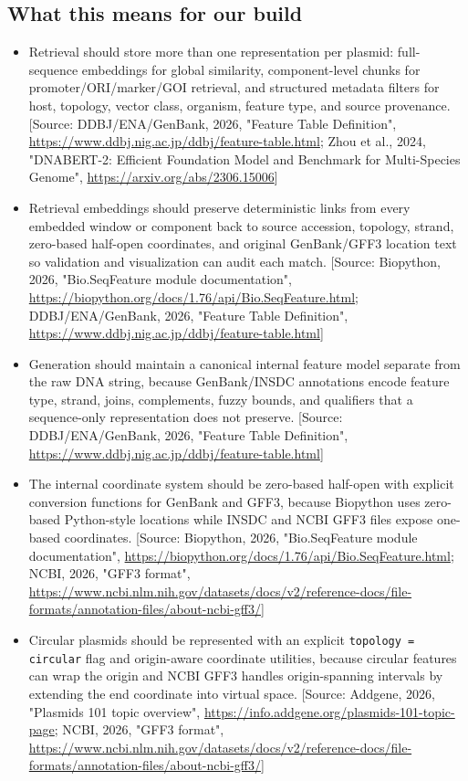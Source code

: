 \documentclass[11pt]{report}
\begin{document}
\subsection{What this means for our build}
\begin{itemize}
\item Retrieval should store more than one representation per plasmid: full-sequence embeddings for global similarity, component-level chunks for promoter/ORI/marker/GOI retrieval, and structured metadata filters for host, topology, vector class, organism, feature type, and source provenance. [Source: DDBJ/ENA/GenBank, 2026, "Feature Table Definition", \url{https://www.ddbj.nig.ac.jp/ddbj/feature-table.html}; Zhou et al., 2024, "DNABERT-2: Efficient Foundation Model and Benchmark for Multi-Species Genome", \url{https://arxiv.org/abs/2306.15006}]
\item Retrieval embeddings should preserve deterministic links from every embedded window or component back to source accession, topology, strand, zero-based half-open coordinates, and original GenBank/GFF3 location text so validation and visualization can audit each match. [Source: Biopython, 2026, "Bio.SeqFeature module documentation", \url{https://biopython.org/docs/1.76/api/Bio.SeqFeature.html}; DDBJ/ENA/GenBank, 2026, "Feature Table Definition", \url{https://www.ddbj.nig.ac.jp/ddbj/feature-table.html}]
\item Generation should maintain a canonical internal feature model separate from the raw DNA string, because GenBank/INSDC annotations encode feature type, strand, joins, complements, fuzzy bounds, and qualifiers that a sequence-only representation does not preserve. [Source: DDBJ/ENA/GenBank, 2026, "Feature Table Definition", \url{https://www.ddbj.nig.ac.jp/ddbj/feature-table.html}]
\item The internal coordinate system should be zero-based half-open with explicit conversion functions for GenBank and GFF3, because Biopython uses zero-based Python-style locations while INSDC and NCBI GFF3 files expose one-based coordinates. [Source: Biopython, 2026, "Bio.SeqFeature module documentation", \url{https://biopython.org/docs/1.76/api/Bio.SeqFeature.html}; NCBI, 2026, "GFF3 format", \url{https://www.ncbi.nlm.nih.gov/datasets/docs/v2/reference-docs/file-formats/annotation-files/about-ncbi-gff3/}]
\item Circular plasmids should be represented with an explicit \texttt{topology = circular} flag and origin-aware coordinate utilities, because circular features can wrap the origin and NCBI GFF3 handles origin-spanning intervals by extending the end coordinate into virtual space. [Source: Addgene, 2026, "Plasmids 101 topic overview", \url{https://info.addgene.org/plasmids-101-topic-page}; NCBI, 2026, "GFF3 format", \url{https://www.ncbi.nlm.nih.gov/datasets/docs/v2/reference-docs/file-formats/annotation-files/about-ncbi-gff3/}]

\end{itemize}
\end{document}
